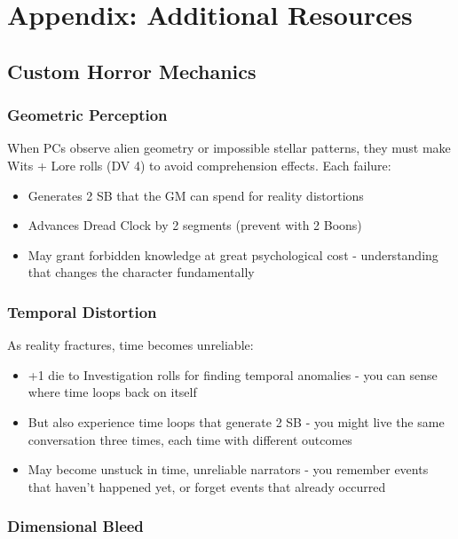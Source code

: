 \documentclass[11pt]{article}
\begin{document}
\section{Appendix: Additional Resources}

\subsection{Custom Horror Mechanics}

\subsubsection{Geometric Perception}

When PCs observe alien geometry or impossible stellar patterns, they must make Wits + Lore rolls (DV 4) to avoid comprehension effects. Each failure:
\begin{itemize}
\item Generates 2 SB that the GM can spend for reality distortions
\item Advances Dread Clock by 2 segments (prevent with 2 Boons)
\item May grant forbidden knowledge at great psychological cost - understanding that changes the character fundamentally
\end{itemize}

\subsubsection{Temporal Distortion}

As reality fractures, time becomes unreliable:
\begin{itemize}
\item +1 die to Investigation rolls for finding temporal anomalies - you can sense where time loops back on itself
\item But also experience time loops that generate 2 SB - you might live the same conversation three times, each time with different outcomes
\item May become unstuck in time, unreliable narrators - you remember events that haven't happened yet, or forget events that already occurred
\end{itemize}

\subsubsection{Dimensional Bleed}
\end{document}
